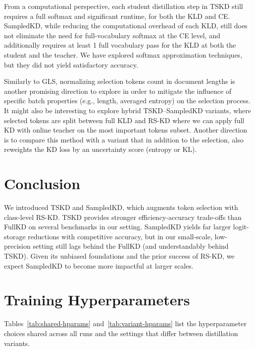\documentclass[11pt]{article}
\begin{document}
From a computational perspective, each student distillation step in TSKD still requires a full softmax and significant runtime, for both the KLD and CE.
SampledKD, while reducing the computational overhead of each KLD, still does not eliminate the need for full-vocabulary softmax at the CE level, and additionally requires at least 1 full vocabulary pass for the KLD at both the student and the teacher.
We have explored softmax approximation techniques, but they did not yield satisfactory accuracy.

Similarly to GLS, normalizing selection tokens count in document lengths is another promising direction to explore in order to mitigate the influence of specific batch properties (e.g., length, averaged entropy) on the selection process.
It might also be interesting to explore hybrid TSKD--SampledKD variants, where selected tokens are split between full KLD and RS-KD where we can apply full KD with online teacher on the most important tokens subset.
Another direction is to compare this method with a variant that in addition to the selection, also reweights the KD loss by an uncertainty score (entropy or KL).

\section{Conclusion}
\label{sec:conclusion}
We introduced TSKD and SampledKD, which augments token selection with class-level RS-KD.
TSKD provides stronger efficiency-accuracy trade-offs than FullKD on several benchmarks in our setting.
SampledKD yields far larger logit-storage reductions with competitive accuracy, but in our small-scale, low-precision setting still lags behind the FullKD (and understandably behind TSKD).
Given its unbiased foundations and the prior success of RS-KD, we expect SampledKD to become more impactful at larger scales.




\appendix
\section{Training Hyperparameters}
\label{app:hyperparams}

Tables~\ref{tab:shared-hparams} and~\ref{tab:variant-hparams} list the hyperparameter choices shared across all runs and the settings that differ between distillation variants.
\end{document}
